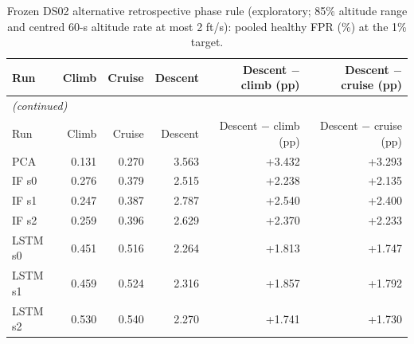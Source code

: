 \begin{footnotesize}
\begin{longtable}{lrrrrr}
\caption{Frozen DS02 alternative retrospective phase rule (exploratory; 85\% altitude range and centred 60-s altitude rate at most 2 ft/s): pooled healthy FPR (\%) at the 1\% target.}\label{tab:s3_alternative_rule}\\
\toprule
Run & Climb & Cruise & Descent & Descent $-$ climb (pp) & Descent $-$ cruise (pp) \\
\midrule
\endfirsthead
\multicolumn{6}{l}{\emph{(continued)}}\\
\toprule
Run & Climb & Cruise & Descent & Descent $-$ climb (pp) & Descent $-$ cruise (pp) \\
\midrule
\endhead
\bottomrule
\endfoot
PCA & 0.131 & 0.270 & 3.563 & +3.432 & +3.293 \\
\midrule
IF s0 & 0.276 & 0.379 & 2.515 & +2.238 & +2.135 \\
\midrule
IF s1 & 0.247 & 0.387 & 2.787 & +2.540 & +2.400 \\
\midrule
IF s2 & 0.259 & 0.396 & 2.629 & +2.370 & +2.233 \\
\midrule
LSTM s0 & 0.451 & 0.516 & 2.264 & +1.813 & +1.747 \\
\midrule
LSTM s1 & 0.459 & 0.524 & 2.316 & +1.857 & +1.792 \\
\midrule
LSTM s2 & 0.530 & 0.540 & 2.270 & +1.741 & +1.730 \\
\end{longtable}
\end{footnotesize}
